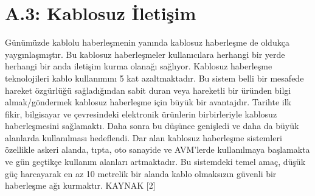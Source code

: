 \clearpage
\section{A.3: Kablosuz İletişim }
\label{CH:AltBolum1.3}

Günümüzde kablolu haberleşmenin yanında kablosuz haberleşme de oldukça yaygınlaşmıştır. Bu kablosuz haberleşmeler kullanıcılara herhangi bir yerde herhangi bir anda iletişim kurma olanağı sağlıyor. Kablosuz haberleşme teknolojileri kablo kullanımını 5 kat azaltmaktadır. Bu sistem belli bir mesafede hareket özgürlüğü sağladığından sabit duran veya hareketli bir üründen bilgi almak/göndermek kablosuz haberleşme için büyük bir avantajdır. Tarihte ilk fikir, bilgisayar ve çevresindeki elektronik ürünlerin birbirleriyle kablosuz haberleşmesini sağlamaktı. Daha sonra bu düşünce genişledi ve daha da büyük alanlarda kullanılması hedeflendi. Dar alan kablosuz haberleşme sistemleri özellikle askeri alanda, tıpta, oto sanayide ve AVM'lerde kullanılmaya başlamakta ve gün geçtikçe kullanım alanları artmaktadır. Bu sistemdeki temel amaç, düşük güç harcayarak en az 10 metrelik bir alanda kablo olmaksızın güvenli bir haberleşme ağı kurmaktır. KAYNAK [2]

